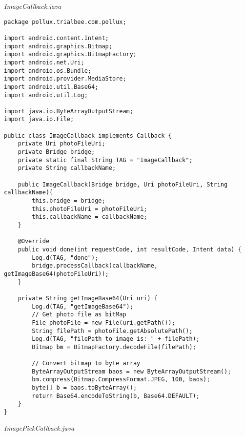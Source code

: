 \emph{ImageCallback.java}
\begin{lstlisting}
package pollux.trialbee.com.pollux;

import android.content.Intent;
import android.graphics.Bitmap;
import android.graphics.BitmapFactory;
import android.net.Uri;
import android.os.Bundle;
import android.provider.MediaStore;
import android.util.Base64;
import android.util.Log;

import java.io.ByteArrayOutputStream;
import java.io.File;

public class ImageCallback implements Callback {
    private Uri photoFileUri;
    private Bridge bridge;
    private static final String TAG = "ImageCallback";
    private String callbackName;

    public ImageCallback(Bridge bridge, Uri photoFileUri, String callbackName){
        this.bridge = bridge;
        this.photoFileUri = photoFileUri;
        this.callbackName = callbackName;
    }

    @Override
    public void done(int requestCode, int resultCode, Intent data) {
        Log.d(TAG, "done");
        bridge.processCallback(callbackName, getImageBase64(photoFileUri));
    }

    private String getImageBase64(Uri uri) {
        Log.d(TAG, "getImageBase64");
        // Get photo file as bitMap
        File photoFile = new File(uri.getPath());
        String filePath = photoFile.getAbsolutePath();
        Log.d(TAG, "filePath to image is: " + filePath);
        Bitmap bm = BitmapFactory.decodeFile(filePath);

        // Convert bitmap to byte array
        ByteArrayOutputStream baos = new ByteArrayOutputStream();
        bm.compress(Bitmap.CompressFormat.JPEG, 100, baos);
        byte[] b = baos.toByteArray();
        return Base64.encodeToString(b, Base64.DEFAULT);
    }
}
\end{lstlisting}
\emph{ImagePickCallback.java}

